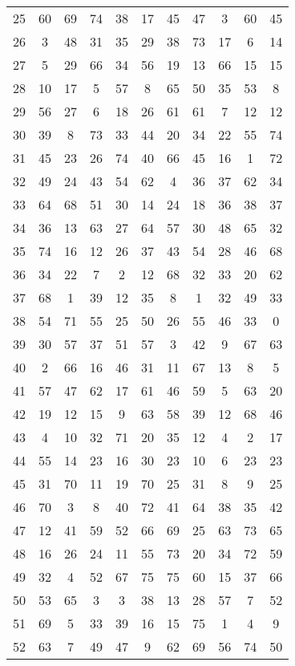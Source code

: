 \begin{table}
\begin{tabular}{c c c c c c c c c c c }
25 & 60 & 69 & 74 & 38 & 17 & 45 & 47 & 3 & 60 & 45 \\
26 & 3 & 48 & 31 & 35 & 29 & 38 & 73 & 17 & 6 & 14 \\
27 & 5 & 29 & 66 & 34 & 56 & 19 & 13 & 66 & 15 & 15 \\
28 & 10 & 17 & 5 & 57 & 8 & 65 & 50 & 35 & 53 & 8 \\
29 & 56 & 27 & 6 & 18 & 26 & 61 & 61 & 7 & 12 & 12 \\
30 & 39 & 8 & 73 & 33 & 44 & 20 & 34 & 22 & 55 & 74 \\
31 & 45 & 23 & 26 & 74 & 40 & 66 & 45 & 16 & 1 & 72 \\
32 & 49 & 24 & 43 & 54 & 62 & 4 & 36 & 37 & 62 & 34 \\
33 & 64 & 68 & 51 & 30 & 14 & 24 & 18 & 36 & 38 & 37 \\
34 & 36 & 13 & 63 & 27 & 64 & 57 & 30 & 48 & 65 & 32 \\
35 & 74 & 16 & 12 & 26 & 37 & 43 & 54 & 28 & 46 & 68 \\
36 & 34 & 22 & 7 & 2 & 12 & 68 & 32 & 33 & 20 & 62 \\
37 & 68 & 1 & 39 & 12 & 35 & 8 & 1 & 32 & 49 & 33 \\
38 & 54 & 71 & 55 & 25 & 50 & 26 & 55 & 46 & 33 & 0 \\
39 & 30 & 57 & 37 & 51 & 57 & 3 & 42 & 9 & 67 & 63 \\
40 & 2 & 66 & 16 & 46 & 31 & 11 & 67 & 13 & 8 & 5 \\
41 & 57 & 47 & 62 & 17 & 61 & 46 & 59 & 5 & 63 & 20 \\
42 & 19 & 12 & 15 & 9 & 63 & 58 & 39 & 12 & 68 & 46 \\
43 & 4 & 10 & 32 & 71 & 20 & 35 & 12 & 4 & 2 & 17 \\
44 & 55 & 14 & 23 & 16 & 30 & 23 & 10 & 6 & 23 & 23 \\
45 & 31 & 70 & 11 & 19 & 70 & 25 & 31 & 8 & 9 & 25 \\
46 & 70 & 3 & 8 & 40 & 72 & 41 & 64 & 38 & 35 & 42 \\
47 & 12 & 41 & 59 & 52 & 66 & 69 & 25 & 63 & 73 & 65 \\
48 & 16 & 26 & 24 & 11 & 55 & 73 & 20 & 34 & 72 & 59 \\
49 & 32 & 4 & 52 & 67 & 75 & 75 & 60 & 15 & 37 & 66 \\
50 & 53 & 65 & 3 & 3 & 38 & 13 & 28 & 57 & 7 & 52 \\
51 & 69 & 5 & 33 & 39 & 16 & 15 & 75 & 1 & 4 & 9 \\
52 & 63 & 7 & 49 & 47 & 9 & 62 & 69 & 56 & 74 & 50 \\

\end{tabular}
\end{table}
